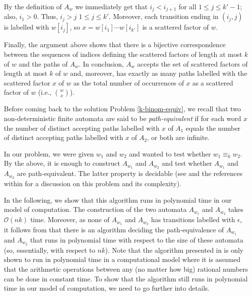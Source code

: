 \documentclass[runningheads]{llncs}
\newcommand{\bigo}{{\mathcal{O}}}
\newcommand{\eps}{\epsilon}
\begin{document}
By the definition of $A_w$ we immediately get that $i_{j}<i_{j+1}$ for all $1\leq j\leq k'-1$; also, $i_1>0$. Thus, $i_j>j$ $1\leq j\leq k'$. Moreover, each transition ending in $(i_j,j)$ is labelled with $w[i_j]$, so $x=w[i_1]\cdots w[i_{k'}]$ is a scattered factor of $w$. 

Finally, the argument above shows that there is a bijective correspondence between the sequences of indices defining the scattered factors of length at most $k$ of $w$ and the paths of $A_w$. In conclusion, $A_w$ accepts the set of scattered factors of length at most $k$ of $w$ and, moreover, has exactly as many paths labelled with the scattered factor $x$ of $w$ as the total number of occurrences of $x$ as a scattered factor of $w$ (i.e., $w\choose x$). 

Before coming back to the solution Problem \ref{k-binom-equiv}, we recall that two non-deterministic finite automata are said to be \emph{path-equivalent} if for each word $x$ the number of distinct accepting paths labelled with $x$ of $A_1$ equals the number of distinct accepting paths labelled with $x$ of $A_2$, or both are infinite. 

In our problem, we were given $w_1$ and $w_2 $ and wanted to test whether $w_1\equiv_k w_2$. By the above, it is enough to construct $A_{w_1}$ and $A_{w_2}$ and test whether $A_{w_1}$ and $A_{w_2}$ are path-equivalent. The latter property is decidable (see \cite{siamNFA,Sak09} and the references within for a discussion on this problem and its complexity).

In the following, we show that this algorithm runs in polynomial time in our model of computation. The construction of the two automata $A_{w_1}$ and $A_{w_2}$ takes $\bigo(nk)$ time. Moreover, as none of $A_{w_1}$ and $A_{w_2}$ has transitions labelled with $\eps$, it follows from \cite{siamNFA} that there is an algorithm deciding the path-equivalence of $A_{w_1}$ and $A_{w_2}$ that runs in polynomial time with respect to the size of these automata (so, essentially, with respect to $nk$). Note that the algorithm presented in \cite{siamNFA} is only shown to run in polynomial time in a computational model where it is assumed that the arithmetic operations between any (no matter how big) rational numbers can be done in constant time. To show that the algorithm still runs in polynomial time in our model of computation, we need to go further into details. 
\end{document}
